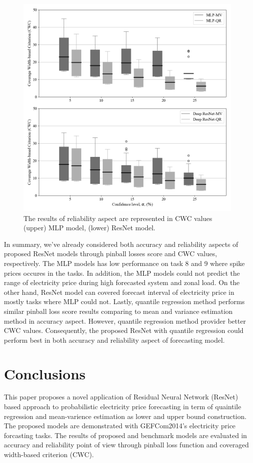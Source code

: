 \documentclass[review]{elsarticle}
\begin{document}
    \begin{figure}[H]
      \centering
      \includegraphics[width=12cm]{boxcompare_MV-QR}
      \caption{The results of reliability aspect are represented in CWC values (upper) MLP model, (lower) ResNet model.}
      \label{Fig:CWC}
    \end{figure}

    In summary, we've already considered both accuracy and reliability aspects of proposed ResNet models through pinball losses score and CWC values, respectively.
    The MLP models has low performance on task 8 and 9 where spike prices occures in the tasks.
    In addition, the MLP models could not predict the range of electricity price during high forecasted system and zonal load.
    On the other hand, ResNet model can covered forecast interval of electricity price in mostly tasks where MLP could not.
    Lastly, quantile regression method performs similar pinball loss score results comparing to mean and variance estimation method in accuracy aspect.
    However, quantile regression method provider better CWC values.
    Consequently, the proposed ResNet with quantile regression could perform best in both accuracy and reliability aspect of forecasting model.

  \section{Conclusions}
    This paper proposes a novel application of Residual Neural Network (ResNet) based approach to probabilistic electricity price forecasting in term of quaintile regression and mean-varience estimation as lower and upper bound construction.
    The proposed models are demonstrated with GEFCom2014's electricity price forcasting tasks. The results of proposed and benchmark models are evaluated in accuracy and reliability point of view through pinball loss function and coveraged width-based criterion (CWC).
\end{document}
